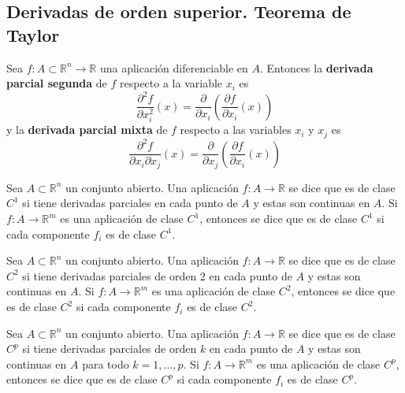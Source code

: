 \subsection{Derivadas de orden superior. Teorema de Taylor}
\begin{definición}
    Sea $f: A \subset \mathbb{R}^n \to \mathbb{R}$ una aplicación diferenciable en $A$. Entonces la \textbf{derivada parcial segunda} de $f$ respecto a la variable $x_i$ es
    $$\frac{\partial^2 f}{\partial x_i^2}(x) = \frac{\partial}{\partial x_i}\left(\frac{\partial f}{\partial x_i}(x)\right)$$
    y la \textbf{derivada parcial mixta} de $f$ respecto a las variables $x_i$ y $x_j$ es
    $$\frac{\partial^2 f}{\partial x_i \partial x_j}(x) = \frac{\partial}{\partial x_j}\left(\frac{\partial f}{\partial x_i}(x)\right)$$
\end{definición}

\begin{definición}[Clase $C^1$]
    Sea $A \subset \mathbb{R}^n$ un conjunto abierto. Una aplicación $f: A \to \mathbb{R}$ se dice que es de clase $C^1$ si tiene derivadas parciales en cada punto de $A$ y estas son continuas en $A$. Si $f: A \to \mathbb{R}^m$ es una aplicación de clase $C^1$, entonces se dice que es de clase $C^1$ si cada componente $f_i$ es de clase $C^1$.
\end{definición}

\begin{definición}[Clase $C^2$]
    Sea $A \subset \mathbb{R}^n$ un conjunto abierto. Una aplicación $f: A \to \mathbb{R}$ se dice que es de clase $C^2$ si tiene derivadas parciales de orden 2 en cada punto de $A$ y estas son continuas en $A$. Si $f: A \to \mathbb{R}^m$ es una aplicación de clase $C^2$, entonces se dice que es de clase $C^2$ si cada componente $f_i$ es de clase $C^2$.
\end{definición}

\begin{definición}[Clase $C^p$]
    Sea $A \subset \mathbb{R}^n$ un conjunto abierto. Una aplicación $f: A \to \mathbb{R}$ se dice que es de clase $C^p$ si tiene derivadas parciales de orden $k$ en cada punto de $A$ y estas son continuas en $A$ para todo $k = 1, \ldots, p$. Si $f: A \to \mathbb{R}^m$ es una aplicación de clase $C^p$, entonces se dice que es de clase $C^p$ si cada componente $f_i$ es de clase $C^p$.
\end{definición}

